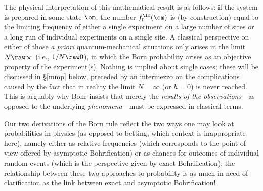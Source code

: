 \documentclass[12pt]{article}
\begin{document}
The physical interpretation of this mathematical result is as follows: if the system is prepared in some state $\om$, 
the number $f_0^{\lm}(\om)$ is (by construction) equal to the limiting frequency of either a single experiment on a large number of sites or a long run of individual experiments on a single site. A classical perspective on either of those \emph{a priori} quantum-mechanical situations only arises in the limit $N\raw\infty$ (i.e., $1/N\raw 0$), in which  the Born probability arises as an objective property of the experiment(s).  Nothing is implied about single cases; these will be discussed in \S\ref{mmp} below, preceded by an intermezzo on the complications caused by the fact that in reality the limit $N=\infty$ (or $\hbar=0$) is never reached. This is arguably why Bohr insists that merely the \emph{results of the observations}---as opposed to the underlying \emph{phenomena}---must be expressed in classical terms. 

 Our two derivations of the Born rule reflect the two ways one may look at probabilities in physics (as opposed to betting, which context is inappropriate here), namely either as relative frequencies (which corresponds to the point of view offered by asymptotic  Bohrification) or as chances for outcomes of individual random events (which is the perspective given by exact  Bohrification); the relationship between these two approaches to probability is as much in need of clarification as  the link between exact and asymptotic Bohrification!
\end{document}
